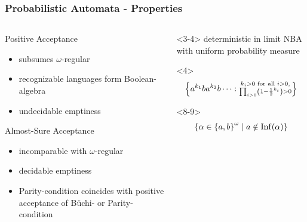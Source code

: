 \documentclass{beamer}
\begin{document}
  \begin{frame}
    \frametitle{Probabilistic Automata - Properties}
    \begin{columns}
      \begin{column}{0.5\textwidth}
        \small{Positive Acceptance}
        \begin{itemize}
          \item<2-> subsumes $\omega$-regular
          \item<5-> recognizable languages form Boolean-algebra
          \item<6-> undecidable emptiness
        \end{itemize}
        \small{Almost-Sure Acceptance}
        \begin{itemize}
          \item<7-> incomparable with $\omega$-regular
          \item<10-> decidable emptiness
          \item<11-> \alert{Parity-}condition coincides with positive
            acceptance of Büchi- or Parity-condition
        \end{itemize}
      \end{column}
      \begin{column}{0.5\textwidth}
        \begin{overlayarea}{\textwidth}{\textheight}
          \begin{onlyenv}<3-4>
            \vspace{0.3\textheight}
            deterministic in limit \ac{NBA} with uniform probability measure
            \vfill
            \begin{uncoverenv}<4>
              \begin{equation*}
                \left\{
                  a^{k_{1}}ba^{k_{2}}b\dots:
                  \substack{k_{i}>0\text{ for all }i>0,\\
                  \prod_{i>0}\left(1-\frac{1}{2}^{k_{i}}\right) > 0}
                \right\}
              \end{equation*}
            \end{uncoverenv}
          \end{onlyenv}
          \begin{onlyenv}<8-9>
            \vspace{0.2\textheight}
            \begin{equation*}
              \left\{\alpha\in\left\{a,b\right\}^{\omega}\mid a\notin\operatorname{Inf}(\alpha)\right\}
            \end{equation*}

\end{onlyenv}
\end{overlayarea}
\end{column}
\end{columns}
\end{frame}
\end{document}
